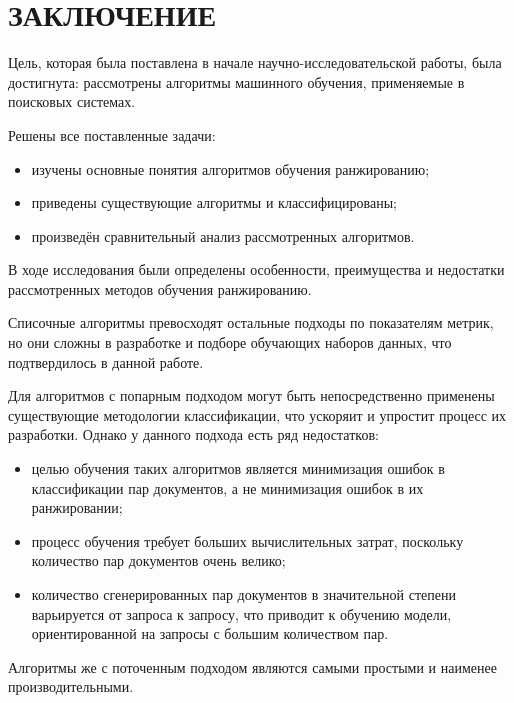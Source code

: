 \chapter*{ЗАКЛЮЧЕНИЕ}

Цель, которая была поставлена в начале научно-исследовательской работы, была достигнута: рассмотрены алгоритмы машинного обучения, применяемые в поисковых системах.

Решены все поставленные задачи:
\begin{itemize}[label=---]
	\item изучены основные понятия алгоритмов обучения ранжированию;
	\item приведены существующие алгоритмы и классифицированы;
	\item произведён сравнительный анализ рассмотренных алгоритмов.
\end{itemize}


В ходе исследования были определены особенности, преимущества и недостатки рассмотренных методов обучения ранжированию.

Списочные алгоритмы превосходят остальные подходы по показателям метрик, но они сложны в разработке и подборе обучающих наборов данных, что подтвердилось в данной работе.

Для алгоритмов с попарным подходом могут быть непосредственно применены существующие методологии классификации, что ускоряит и упростит процесс их разработки. Однако у данного подхода есть ряд недостатков:
\begin{itemize}[label=---]
	\item целью обучения таких алгоритмов является минимизация ошибок в классификации пар документов, а не минимизация ошибок в их ранжировании;
	\item процесс обучения требует больших вычислительных затрат, поскольку количество пар документов очень велико;
	\item количество сгенерированных пар документов в значительной степени варьируется от запроса к запросу, что приводит к обучению модели, ориентированной на запросы с большим количеством пар.
\end{itemize}

Алгоритмы же с поточенным подходом являются самыми простыми и наименее производительными. 